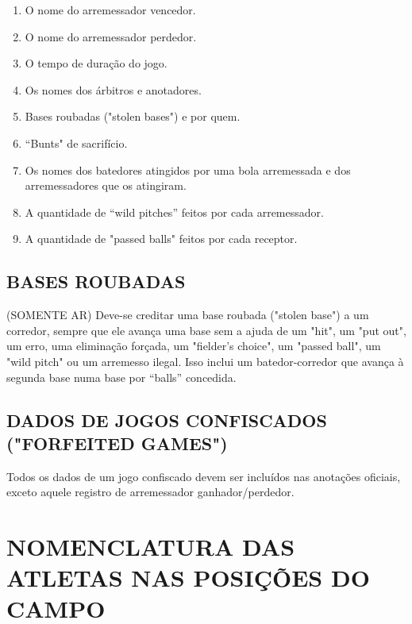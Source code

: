 \begin{multicols}{2}
\begin{enumerate}[label=\alph*)]
		\item  O nome do arremessador vencedor.

		\item  O nome do arremessador perdedor.

		\item  O tempo de duração do jogo.

		\item  Os nomes dos árbitros e anotadores.

		\item  Bases roubadas ("stolen bases") e por quem.

		\item  “Bunts" de sacrifício.

		\item  Os nomes dos batedores atingidos por uma bola arremessada e dos arremessadores
		que os atingiram.

		\item  A quantidade de “wild pitches” feitos por cada arremessador.

		\item  A quantidade de "passed balls" feitos por cada receptor.
	\end{enumerate}
\end{multicols}
\section{BASES ROUBADAS}
\begin{multicols}{2}
	(SOMENTE AR) Deve-se creditar uma base roubada ("stolen base") a um corredor,
	sempre que ele avança uma base sem a ajuda de um "hit", um "put out", um erro, uma
	eliminação forçada, um "fielder's choice", um "passed ball", um "wild pitch" ou um
	arremesso ilegal. Isso inclui um batedor-corredor que avança à segunda base numa
	base por “balls” concedida.
\end{multicols}

\section{DADOS DE JOGOS CONFISCADOS ("FORFEITED GAMES")}
\begin{multicols}{2}
	Todos os dados de um jogo confiscado devem ser incluídos nas anotações oficiais,
	exceto aquele registro de arremessador ganhador/perdedor.
\end{multicols}


\chapter{NOMENCLATURA DAS ATLETAS NAS POSIÇÕES DO CAMPO}


